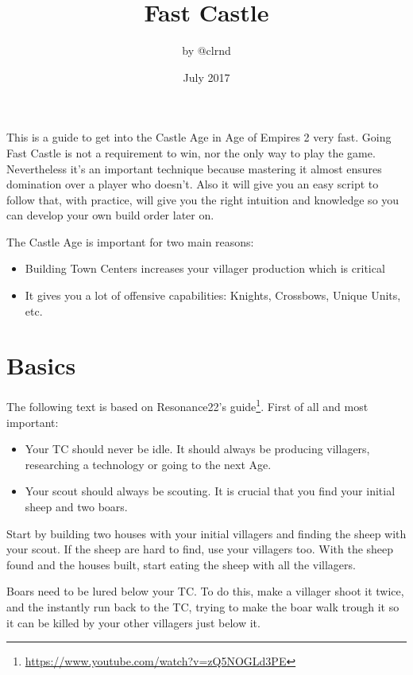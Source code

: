 \documentclass{article}
\title{Fast Castle}
\author{by @clrnd}
\date{July 2017}
\begin{document}
\maketitle

This is a guide to get into the Castle Age in Age of Empires 2 very fast.
Going Fast Castle is not a requirement to win, nor the only way to play the game.
Nevertheless it's an important technique because mastering it almost ensures domination over a player who doesn't.
Also it will give you an easy script to follow that, with practice, will give you the right intuition and knowledge so you can develop your own build order later on.

The Castle Age is important for two main reasons:

\begin{itemize}
  \item Building Town Centers increases your villager production which is critical
  \item It gives you a lot of offensive capabilities: Knights, Crossbows, Unique Units, etc.
\end{itemize}

\section*{Basics}

The following text is based on Resonance22's guide\footnote{\url{https://www.youtube.com/watch?v=zQ5NOGLd3PE}}.
First of all and most important:

\begin{itemize}
  \item Your TC should never be idle. It should always be producing villagers, researching a technology or going to the next Age.
  \item Your scout should always be scouting. It is crucial that you find your initial sheep and two boars.
\end{itemize}

Start by building two houses with your initial villagers and finding the sheep with your scout. If the sheep are hard to find, use your villagers too. With the sheep found and the houses built, start eating the sheep with all the villagers.

Boars need to be lured below your TC. To do this, make a villager shoot it twice, and the instantly run back to the TC, trying to make the boar walk trough it so it can be killed by your other villagers just below it.
\end{document}
